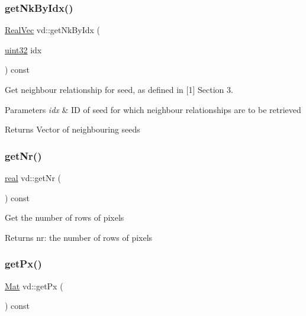 \subsubsection{\texorpdfstring{get\+Nk\+By\+Idx()}{getNkByIdx()}}
{\footnotesize\ttfamily \mbox{\hyperlink{typedefs_8cpp_a84b6d9a0fbb45e01ad4a3aa5667f2992}{Real\+Vec}} vd\+::get\+Nk\+By\+Idx (\begin{DoxyParamCaption}\item[{\mbox{\hyperlink{typedefs_8cpp_a8ad23e2333787a214e20a58a284a5a60}{uint32}}}]{idx }\end{DoxyParamCaption}) const}

Get neighbour relationship for seed, as defined in \mbox{[}1\mbox{]} Section 3. 
\begin{DoxyParams}{Parameters}
{\em idx} & ID of seed for which neighbour relationships are to be retrieved \\
\hline
\end{DoxyParams}
\begin{DoxyReturn}{Returns}
Vector of neighbouring seeds 
\end{DoxyReturn}
\mbox{\label{classvd_a1a1634d6906eb0af4d877c2af3292ca7}} 
\subsubsection{\texorpdfstring{get\+Nr()}{getNr()}}
{\footnotesize\ttfamily \mbox{\hyperlink{typedefs_8cpp_a58a0c7cf2501f4492da833421be92547}{real}} vd\+::get\+Nr (\begin{DoxyParamCaption}{ }\end{DoxyParamCaption}) const}

Get the number of rows of pixels \begin{DoxyReturn}{Returns}
nr\+: the number of rows of pixels 
\end{DoxyReturn}
\mbox{\label{classvd_aeba6d318016c8f8b9537ce4c0314f8cd}} 
\subsubsection{\texorpdfstring{get\+Px()}{getPx()}}
{\footnotesize\ttfamily \mbox{\hyperlink{typedefs_8cpp_a9fa28c1f74e909474857584f5c7b0088}{Mat}} vd\+::get\+Px (\begin{DoxyParamCaption}{ }\end{DoxyParamCaption}) const}

